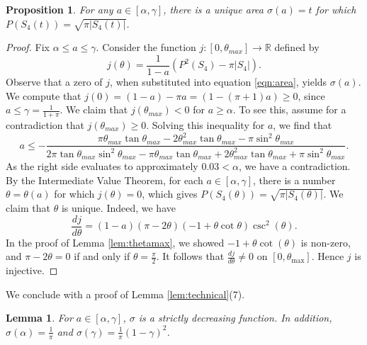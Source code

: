 \documentclass[leqno]{article}
\numberwithin{equation}{section}
\theoremstyle{definition}
\theoremstyle{remark}
\theoremstyle{plain}
\newtheorem{lemma}[equation]{Lemma}
\newtheorem{proposition}[equation]{Proposition}
\begin{document}
\begin{proposition}\label{prop:sigmadefined} For any $a\in [\alpha,\gamma]$, there is a unique area $\sigma(a) = t$ for which $P(S_4(t)) = \sqrt{\pi |S_4(t)|}$.

\end{proposition}

\begin{proof}
Fix $\alpha \leq a\leq \gamma$.  Consider the function $j:[0,\theta_{max}]\rightarrow \mathbb{R}$ defined by \begin{equation}\label{eqn:j}j(\theta) = \frac{1}{1-a}\left(P^2(S_4) - \pi |S_4|\right).\end{equation}  Observe that a zero of $j$, when substituted into equation \eqref{eqn:area}, yields $\sigma(a)$. We compute that $j(0) = (1-a) - \pi a = (1-(\pi+1)a) \geq 0$, since $a\leq \gamma= \frac{1}{1+\pi}$. We claim that $j(\theta_{max}) < 0$ for $ a\geq \alpha$.  To see this, assume for a contradiction that $j(\theta_{max}) \geq 0$.  Solving this inequality for $a$, we find that $$a\leq -\frac{\pi\theta_{max} \tan  \theta_{max}  -2 \theta_{max}^{2} \tan\theta_{max}-\pi\sin^2 \theta_{max}}{2\pi \tan\theta_{max}  \sin^2 \theta_{max} -\pi\theta_{max}\tan \theta_{max} +2 \theta_{max}^{2} \tan\theta_{max}+\pi\sin^2 \theta_{max}}.$$  As the right side evaluates to approximately $0.03 < \alpha$, we have a contradiction.  By the Intermediate Value Theorem, for each $a\in [\alpha,\gamma]$, there is a number $\theta = \theta(a)$ for which $j(\theta) = 0$,  which gives $P(S_4(\theta)) = \sqrt{\pi |S_4(\theta)|}$. We claim that $\theta$ is unique.  Indeed, we have $$\frac{dj}{d\theta} = (1 - a) (\pi - 2 \theta) (-1 + \theta \cot\theta) \csc^2(\theta).$$ In the proof of Lemma \ref{lem:thetamax}, we showed $-1 + \theta\cot(\theta)$ is non-zero, and $\pi - 2\theta = 0$ if and only if $\theta = \frac{\pi}{2}$.  It follows that $\frac{dj}{d\theta}\neq 0$  on $[0,\theta_{\max}]$. Hence $j$ is injective.

\end{proof}

We conclude with a proof of Lemma \ref{lem:technical}(7).

\begin{lemma}\label{lem:sigmataubound}  For $a\in [\alpha,\gamma]$, $\sigma$ is a strictly decreasing function.  In addition, $\sigma(\alpha) = \frac{1}{\pi}$ and $\sigma(\gamma) = \frac{1}{\pi}(1-\gamma)^2$.  
\end{lemma}
\end{document}
